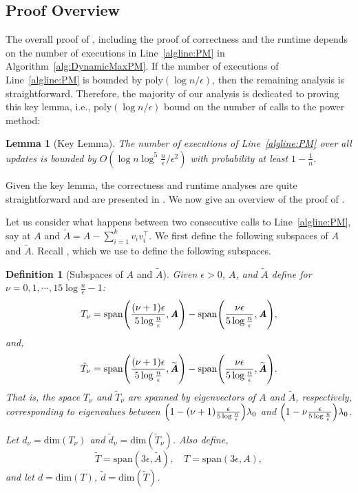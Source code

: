 \documentclass[11pt]{article}
\newtheorem{lemma}[theorem]{Lemma}
\newtheorem{definition}[theorem]{Definition}
\newcommand\poly{\mathrm{poly}}  \newcommand{\comp}[1]{\overline{#1}}
\let\originalleft\left
\let\originalright\right
\renewcommand{\left}{\mathopen{}\mathclose\bgroup\originalleft}
\renewcommand{\right}{\aftergroup\egroup\originalright}
\def\dim#1{\mathrm{dim} (#1)}
\newcommand\vv{\boldsymbol{\mathit{v}}}
\renewcommand\AA{\boldsymbol{\mathit{A}}}
\newcommand\Ttil{{\tilde{\mathit{T}}}}
\newcommand\AAtil{\boldsymbol{\widetilde{\mathit{A}}}}
\newcommand\Span{\mathrm{span}}
\begin{document}
\subsection{Proof Overview}
The overall proof of , including the proof of correctness and the runtime depends on the number of executions in Line~\ref{algline:PM} in Algorithm~\ref{alg:DynamicMaxPM}. If the number of executions of Line~\ref{algline:PM} is bounded by $\poly(\log n/\epsilon)$, then the remaining analysis is straightforward. Therefore, the majority of our analysis is dedicated to proving this key lemma, i.e., $\poly(\log n/\epsilon)$ bound on the number of calls to the power method:
\begin{lemma}[Key Lemma]\label{lem:BoundW}
The number of executions of Line~\ref{algline:PM} over all updates is bounded by $O(\log n\log^5\frac{n}{\epsilon}/\epsilon^2)$ with probability at least $1-\frac{1}{n}$.
\end{lemma}
Given the key lemma, the correctness and runtime analyses are quite straightforward and are presented in . We now give an overview of the proof of .


Let us consider what happens between two consecutive calls to Line~\ref{algline:PM}, say at $\AA$ and $\AAtil = \AA - \sum_{i=1}^k\vv_i\vv_i^{\top}$. We first define the following subspaces of $\AA$ and $\AAtil$.
Recall , which we use to define the following subspaces.

\begin{definition}[Subspaces of $\AA$ and $\AAtil$]\label{def:SpaceA} Given $\epsilon>0$, $\AA$, and $\AAtil$ define for $\nu = 0,1,\cdots, 15\log \frac{n}{\epsilon}-1$:
\[
T_{\nu} = \Span\left(\frac{(\nu+1)\epsilon}{5\log \frac{n}{\epsilon}},\AA\right) -\Span\left(\frac{\nu\epsilon}{5\log \frac{n}{\epsilon}},\AA\right),
\]
and,
\[
\tilde{T}_{\nu} = \Span\left(\frac{(\nu+1)\epsilon}{5\log \frac{n}{\epsilon}},\AAtil\right)-\Span\left(\frac{\nu\epsilon}{5\log \frac{n}{\epsilon}},\AAtil\right).
\]
That is, the space $T_{\nu}$ and $\Ttil_\nu$ are spanned by eigenvectors of $\AA$ and $\AAtil$, respectively, corresponding to eigenvalues between $\left(1-(\nu+1)\frac{\epsilon}{5\log \frac{n}{\epsilon}}\right)\lambda_0$ and $\left(1-\nu\frac{\epsilon}{5\log \frac{n}{\epsilon}}\right)\lambda_0$.

Let $d_{\nu} = \dim{T_{\nu}}$ and $\tilde{d}_{\nu} = \dim{\tilde{T}_{\nu}}$. Also define,
\[
\tilde{T} = \Span(3\epsilon,\AAtil),\quad  T = \Span(3\epsilon,\AA),
\]
and let $d = \dim{T}$, $\tilde{d} = \dim{\tilde{T}}$.
\end{definition}
\end{document}
